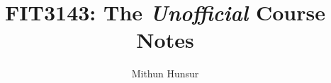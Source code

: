 \documentclass[a4paper]{report}
\title{FIT3143: The \textit{Unofficial} Course Notes}
\author{Mithun Hunsur}
\makeatletter
\renewcommand*\l@figure{\@dottedtocline{1}{1em}{3.2em}}
\makeatother
\begin{document}
\maketitle\makeatletter
     \renewcommand*\l@figure{\@dottedtocline{1}{1em}{3.2em}}
\makeatother

\renewcommand{\thepage}{\roman{page}}
\setcounter{page}{1}
	\tableofcontents
	\listoffigures
	\listoftables
	\listofalgorithms

\renewcommand{\thepage}{\arabic{page}}
\setcounter{page}{1}
	
	
	
	
	
	
	
	
	
	
	
	
	
	
\end{document}
